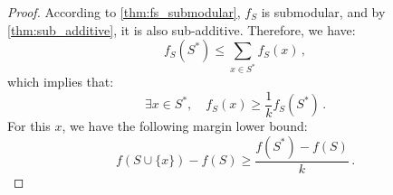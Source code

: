 \begin{proof}
    According to \cref{thm:fs_submodular}, \(f_S\) is submodular, and by \cref{thm:sub_additive}, it is also sub-additive. Therefore, we have:
    \begin{equation}
        f_S(S^*) \leq \sum_{x \in S^*} f_S(x)\,,
    \end{equation}
    which implies that:
    \begin{equation}
        \exists x \in S^*, \quad f_S(x) \geq \frac{1}{k} f_S(S^*) \,.
    \end{equation}
    For this \(x\), we have the following margin lower bound:
    \begin{equation}\label{eq:margin_lowerbound}
        f(S \cup \{x\}) - f(S) \geq \frac{f(S^*) - f(S)}{k}\,.
    \end{equation}
    

\end{proof}

